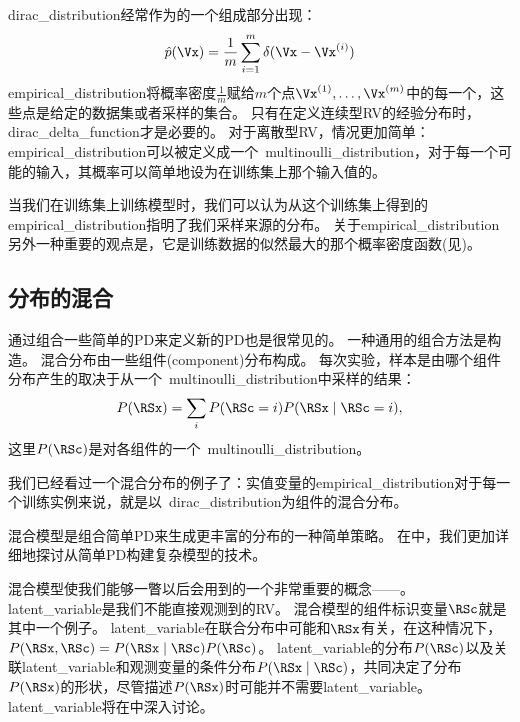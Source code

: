 \gls{dirac_distribution}经常作为的一个组成部分出现：
\begin{equation}
\hat{p}(\Vx) = \frac{1}{m} \sum_{i=1}^m \delta(\Vx - \Vx^{(i)})
\end{equation}
\gls{empirical_distribution}将概率密度$\frac{1}{m}$赋给$m$个点$\Vx^{(1)}, \ldots, \Vx^{(m)}$中的每一个，这些点是给定的数据集或者采样的集合。
只有在定义连续型\gls{RV}的经验分布时，\gls{dirac_delta_function}才是必要的。
对于离散型\gls{RV}，情况更加简单：\gls{empirical_distribution}可以被定义成一个~\gls{multinoulli_distribution}，对于每一个可能的输入，其概率可以简单地设为在训练集上那个输入值的。

当我们在训练集上训练模型时，我们可以认为从这个训练集上得到的\gls{empirical_distribution}指明了我们采样来源的分布。
关于\gls{empirical_distribution}另外一种重要的观点是，它是训练数据的似然最大的那个概率密度函数(见)。

\subsection{分布的混合}
\label{sec:mixtures_of_distributions}

通过组合一些简单的\gls{PD}来定义新的\gls{PD}也是很常见的。
一种通用的组合方法是构造。
混合分布由一些组件(component)分布构成。
每次实验，样本是由哪个组件分布产生的取决于从一个~\gls{multinoulli_distribution}中采样的结果：
\begin{equation}
P(\RSx) = \sum_i P(\RSc = i) P(\RSx \mid \RSc = i),
\end{equation}
这里$P(\RSc)$是对各组件的一个~\gls{multinoulli_distribution}。

我们已经看过一个混合分布的例子了：实值变量的\gls{empirical_distribution}对于每一个训练实例来说，就是以~\gls{dirac_distribution}为组件的混合分布。


混合模型是组合简单\gls{PD}来生成更丰富的分布的一种简单策略。
在中，我们更加详细地探讨从简单\gls{PD}构建复杂模型的技术。

混合模型使我们能够一瞥以后会用到的一个非常重要的概念——。
\gls{latent_variable}是我们不能直接观测到的\gls{RV}。
混合模型的组件标识变量$\RSc$就是其中一个例子。
\gls{latent_variable}在联合分布中可能和$\RSx$有关，在这种情况下，$P(\RSx, \RSc) = P(\RSx \mid \RSc)P(\RSc)$。
\gls{latent_variable}的分布$P(\RSc)$以及关联\gls{latent_variable}和观测变量的条件分布$P(\RSx \mid\RSc)$，共同决定了分布$P(\RSx)$的形状，尽管描述$P(\RSx)$时可能并不需要\gls{latent_variable}。
\gls{latent_variable}将在中深入讨论。

